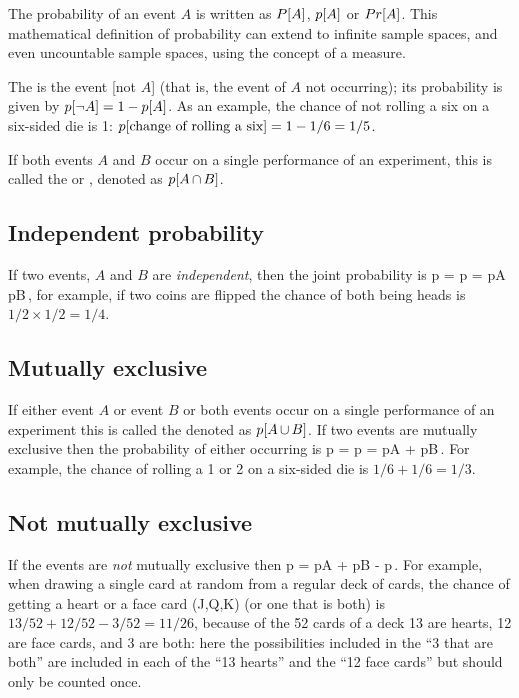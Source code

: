 The probability of an event $A$ is written as $P\!\left[{A}\right]$, $p\!\left[{A}\right]$ or $Pr\!\left[{A}\right]$. This mathematical definition of probability can extend to infinite sample spaces, and even uncountable sample spaces, using the concept of a measure.

The is the event [not $A$] (that is, the event of $A$ not occurring); its probability is given by $p\!\left[{\lnot A}\right] = 1 - p\!\left[{A}\right]$. As an example, the chance of not rolling a six on a six-sided die is 1: $p\!\left[{\text{change of rolling a six}}\right] = 1 - 1/6 = 1/5$.

If both events $A$ and $B$ occur on a single performance of an experiment, this is called the  or , denoted as $p\!\left[{A\operatorname{\cap} B}\right]$.



\subsection{Independent probability}
If two events, $A$ and $B$ are \emph{independent}, then the joint probability is
\beq
p = p = p\vat A p\vat B\,,
\eeq
for example, if two coins are flipped the chance of both being heads is $1/2\times 1/2 = 1/4$.


\subsection{Mutually exclusive}
If either event $A$ or event $B$ or both events occur on a single performance of an experiment this is called the  denoted as $p\!\left[{A\operatorname{\cup} B}\right]$. If two events are mutually exclusive then the probability of either occurring is
\beq
p = p = p\vat A + p\vat B\,.
\eeq
For example, the chance of rolling a 1 or 2 on a six-sided die is $1/6 + 1/6 = 1/3$.


\subsection{Not mutually exclusive}
If the events are \emph{not} mutually exclusive then
\beq
p = p\vat A + p\vat B - p\,.
\eeq
For example, when drawing a single card at random from a regular deck of cards, the chance of getting a heart or a face card (J,Q,K) (or one that is both) is $13/52 + 12/52 - 3/52 = 11/26$, because of the 52 cards of a deck 13 are hearts, 12 are face cards, and 3 are both: here the possibilities included in the ``3 that are both'' are included in each of the ``13 hearts'' and the ``12 face cards'' but should only be counted once.


